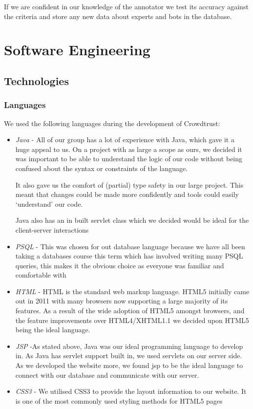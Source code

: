 \documentclass[11pt]{article}
\begin{document}
If we are confident in our knowledge of the annotator we test its accuracy against the criteria and store any new data about experts and bots in the database.\\

 
 
\section{Software Engineering}
\subsection{Technologies}
\subsubsection{Languages}
We used the following languages during the development of Crowdtrust:
\begin{itemize}
\item
\emph{Java} - All of our group has a lot of experience with Java, which gave it a huge appeal to us.
On a project with as large a scope as ours, we decided it was important to be able
to understand the logic of our code without being confused about the syntax or
constraints of the language.

It also gave us the comfort of (partial) type safety in our large project. This meant that changes could be made more confidently and tools could easily `understand' our code.

Java also has an in built servlet class which we
decided would be ideal for the client-server interactions 
\item
\emph{PSQL} - This was chosen for out database language because we have all been
taking a databases course this term which has involved writing many PSQL queries,
this makes it the obvious choice as everyone was familiar and comfortable with 
\item
\emph{HTML} -
HTML is the standard web markup language. HTML5 initially came out in 2011 with many
browsers now supporting a large majority of its features. As a result of the wide
adoption of HTML5 amongst browsers, and the feature improvements over HTML4/XHTML1.1
we decided upon HTML5 being the ideal language.
\item
\emph{JSP} -As stated above, Java was our ideal programming language to develop in. As Java
has servlet support built in, we used servlets on our server side. As we developed
the website more, we found jsp to be the ideal language to connect with our database
and communicate with our server.
\item
\emph{CSS3} - We utilised CSS3 to provide the layout information to our website. It is one of the
most commonly used styling methods for HTML5 pages
\end{itemize}
\end{document}
